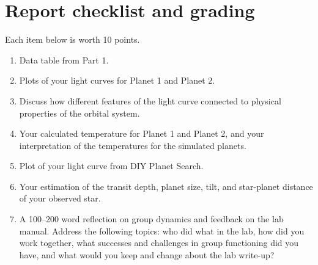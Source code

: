 \section{Report checklist and grading}

Each item below is worth 10 points.

\begin{enumerate}
	\item Data table from Part 1.
	
	\item Plots of your light curves for Planet 1 and Planet 2.
	
	\item Discuss how different features of the light curve connected to physical
	properties of the orbital system.
	
	\item Your calculated temperature for Planet 1 and Planet 2, and your interpretation of the
	temperatures for the simulated planets.
	
	\item Plot of your light curve from DIY Planet Search.
	
	\item Your estimation of the transit depth, planet size, tilt, and star-planet distance of your observed star.
	
	\item A 100--200 word reflection on group dynamics and feedback on the lab manual. Address the following topics: who did what in the lab, how did you work together, what successes and challenges in group functioning did you have, and what would you keep and change about the lab write-up?
\end{enumerate}